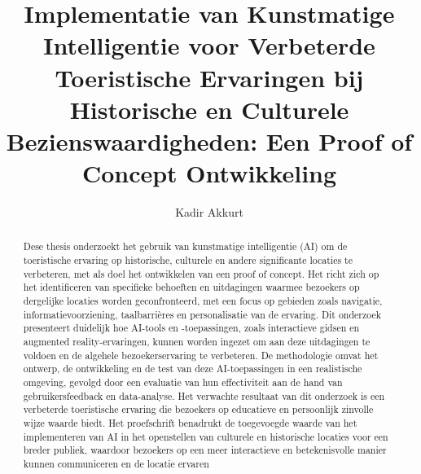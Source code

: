\documentclass{hogent-article}
\title{Implementatie van Kunstmatige Intelligentie voor Verbeterde Toeristische Ervaringen bij Historische en Culturele Bezienswaardigheden: Een Proof of Concept Ontwikkeling}
\author{Kadir Akkurt}
\begin{document}
\begin{abstract}
  
 Dese thesis onderzoekt het gebruik van kunstmatige intelligentie (AI) om de toeristische ervaring op historische, culturele en andere significante locaties te verbeteren, met als doel het ontwikkelen van een proof of concept. Het richt zich op het identificeren van specifieke behoeften en uitdagingen waarmee bezoekers op dergelijke locaties worden geconfronteerd, met een focus op gebieden zoals navigatie, informatievoorziening, taalbarrières en personalisatie van de ervaring.
 Dit onderzoek presenteert duidelijk hoe AI-tools en -toepassingen, zoals interactieve gidsen en augmented reality-ervaringen, kunnen worden ingezet om aan deze uitdagingen te voldoen en de algehele bezoekerservaring te verbeteren. De methodologie omvat het ontwerp, de ontwikkeling en de test van deze AI-toepassingen in een realistische omgeving, gevolgd door een evaluatie van hun effectiviteit aan de hand van gebruikersfeedback en data-analyse.
 Het verwachte resultaat van dit onderzoek is een verbeterde toeristische ervaring die bezoekers op educatieve en persoonlijk zinvolle wijze waarde biedt. Het proefschrift benadrukt de toegevoegde waarde van het implementeren van AI in het openstellen van culturele en historische locaties voor een breder publiek, waardoor bezoekers op een meer interactieve en betekenisvolle manier kunnen communiceren en de locatie ervaren
\end{abstract}

\tableofcontents



\setlength\bibitemsep{2pt} %
\printbibliography[heading=bibintoc]
\end{document}
